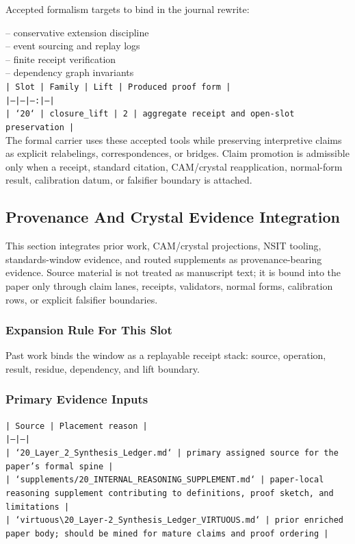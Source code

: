\documentclass[11pt]{article}
\begin{document}
Accepted formalism targets to bind in the journal rewrite:

\noindent{}-- conservative extension discipline\\
\noindent{}-- event sourcing and replay logs\\
\noindent{}-- finite receipt verification\\
\noindent{}-- dependency graph invariants\\

\noindent\texttt{| Slot | Family | Lift | Produced proof form |}\\
\noindent\texttt{|---|---|---:|---|}\\
\noindent\texttt{| `20` | closure\_lift | 2 | aggregate receipt and open-slot preservation |}\\

The formal carrier uses these accepted tools while preserving interpretive
claims as explicit relabelings, correspondences, or bridges. Claim promotion is admissible only when a receipt, standard citation,
CAM/crystal reapplication, normal-form result, calibration datum, or falsifier
boundary is attached.

\subsection*{Provenance And Crystal Evidence Integration}

This section integrates prior work, CAM/crystal projections, NSIT tooling,
standards-window evidence, and routed supplements as provenance-bearing
evidence. Source material is not treated as manuscript text; it is bound into
the paper only through claim lanes, receipts, validators, normal forms,
calibration rows, or explicit falsifier boundaries.

\subsubsection*{Expansion Rule For This Slot}

Past work binds the window as a replayable receipt stack: source, operation, result, residue, dependency, and lift boundary.

\subsubsection*{Primary Evidence Inputs}

\noindent\texttt{| Source | Placement reason |}\\
\noindent\texttt{|---|---|}\\
\noindent\texttt{| `20\_Layer\_2\_Synthesis\_Ledger.md` | primary assigned source for the paper's formal spine |}\\
\noindent\texttt{| `supplements/20\_INTERNAL\_REASONING\_SUPPLEMENT.md` | paper-local reasoning supplement contributing to definitions, proof sketch, and limitations |}\\
\noindent\texttt{| `virtuous\textbackslash{}20\_Layer-2\_Synthesis\_Ledger\_VIRTUOUS.md` | prior enriched paper body; should be mined for mature claims and proof ordering |}\\
\end{document}
